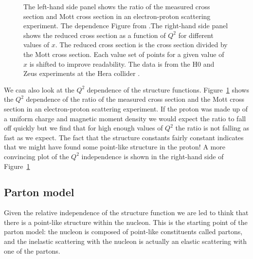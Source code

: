 \documentclass[12pt]{article}
\begin{document}
\begin{figure}[h]
\begin{center}
\end{center}
\caption{The left-hand side panel shows the ratio of the measured cross section and Mott cross section in an electron-proton scattering experiment. The dependence Figure from \cite{Breidenbach:1969kd} .The right-hand side panel shows the reduced cross section as a function of $Q^2$ for different values of $x$. The reduced cross section is the cross section divided by the Mott cross section. Each value set of points for a given value of $x$ is shifted to improve readability. The data is from the H0 and Zeus experiments at the Hera collider \cite{Abramowicz:2015mha}.}\label{fig:DISq2dep}
\end{figure}
We can also look at the $Q^2$ dependence of the structure functions. Figure~\ref{fig:DISq2dep} shows the $Q^2$ dependence of the ratio of the measured cross section and the Mott cross section in an electron-proton scattering experiment. If the proton was made up of a uniform charge and magnetic moment density we would expect the ratio to fall off quickly but we find that for high enough values of $Q^2$ the ratio is not falling as fast as we expect. The fact that the structure constants fairly constant indicates that we might have found some point-like structure in the proton! A more convincing plot of the $Q^2$ independence is shown in the right-hand side of Figure~\ref{fig:DISq2dep}
%
\clearpage
\subsection{Parton model}
%
%
Given the relative independence of the structure function we are led to think that there is a point-like structure within the nucleon. This is the starting point of the parton model: the nucleon is composed of point-like constituents called partons, and the inelastic scattering with the nucleon is actually an elastic scattering with one of the partons. 
\end{document}
